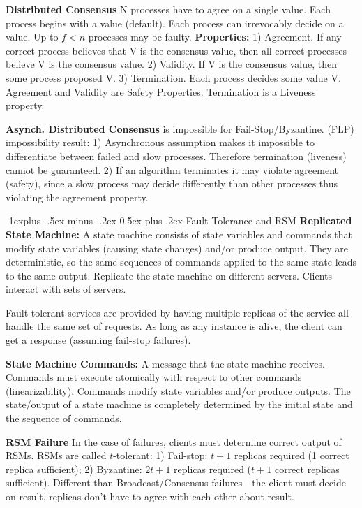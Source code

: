 \documentclass[6pt,landscape]{article}
\makeatletter
\renewcommand{\subsection}{\@startsection{subsection}{2}{0mm}%
                                {-1explus -.5ex minus -.2ex}%
                                {0.5ex plus .2ex}%
                                {\normalfont\normalsize\bfseries}}
\makeatother
\begin{document}
\begin{multicols}{3}
{\bf Distributed Consensus} N processes have to agree on a single value. Each process begins with a value (default). Each process can irrevocably decide on a value. Up to $f < n$ processes may be faulty. {\bf Properties:} 
1) Agreement. If any correct process believes that V is the consensus value, then all correct processes believe V is the consensus value.
2) Validity. If V is the consensus value, then some process proposed V.
3) Termination. Each process decides some value V. 
Agreement and Validity are Safety Properties. Termination is a Liveness property.

{\bf Asynch. Distributed Consensus} is impossible for Fail-Stop/Byzantine. (FLP) impossibility result: 1) Asynchronous assumption makes it impossible to differentiate between failed and slow processes. Therefore termination (liveness) cannot be guaranteed. 2) If an algorithm terminates it may violate agreement (safety), since a slow process may decide differently than other processes thus violating the agreement property.

\subsection{Fault Tolerance and RSM}
{\bf Replicated State Machine:} A state machine consists of state variables and commands that modify state variables (causing state changes) and/or produce output. They are deterministic, so the same sequences of commands applied to the same state leads to the same output. Replicate the state machine on different servers. Clients interact with sets of servers.

Fault tolerant services are provided by having multiple replicas of the service all handle the same set of requests. As long as any instance is alive, the client can get a response (assuming fail-stop failures).

{\bf State Machine Commands:} A message that the state machine receives. 
Commands must execute atomically with respect to other commands (linearizability). Commands modify state variables and/or produce outputs. The state/output of a state machine is completely determined by the initial state and the sequence of commands.

{\bf RSM Failure} In the case of failures, clients must determine correct output of RSMs. RSMs are called $t$-tolerant: 1) Fail-stop: $t + 1$ replicas required (1 correct replica sufficient); 2) Byzantine: $2t + 1$ replicas required ($t + 1$ correct replicas sufficient). Different than Broadcast/Consensus failures - the client must decide on result, replicas don't have to agree with each other about result.


\end{multicols}
\end{document}
